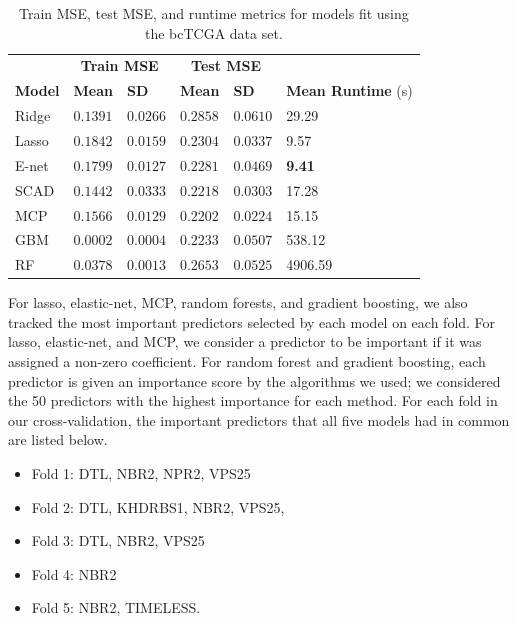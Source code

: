 \documentclass[final,onefignum,onetabnum]{siuro210301}
\begin{document}
	\begin{table}[h!]
		\centering
		\captionsetup{width = 5in}
		\caption{Train MSE, test MSE, and runtime metrics for models fit using the bcTCGA data set.}
		\label{tab:emp_results}
		\begin{tabular}{l|ll|ll|l}
			\hline
			& \multicolumn{2}{c|}{\textbf{Train MSE}} & \multicolumn{2}{c|}{\textbf{Test MSE}} &  \\ 
			\textbf{Model } & \textbf{Mean} & \textbf{SD} & \textbf{Mean} & \textbf{SD} & \textbf{Mean Runtime} (s) \\ 
			\hline
			Ridge  & $0.1391$ & $0.0266$ & $0.2858$ & $0.0610$ & 29.29\\
			Lasso  & $0.1842$ & $0.0159$ & $0.2304$ & $0.0337$ & 9.57\\
			E-net  & $0.1799$ & $0.0127$ & $0.2281$ & $0.0469$ & \textbf{9.41}\\
			SCAD  & $0.1442$ & $0.0333$ & $0.2218$ & $0.0303$ & 17.28\\
			MCP  & $0.1566$ & $0.0129$ & $\mathbf{0.2202}$ & $\mathbf{0.0224}$ & 15.15\\
			GBM  & $\mathbf{0.0002}$ & $\mathbf{0.0004}$ & $0.2233$ & $0.0507$ & 538.12\\
			RF  & $0.0378$ & $0.0013$ & $0.2653$ & $0.0525$ & 4906.59\\
			\hline 
		\end{tabular}
	\end{table}

	For lasso, elastic-net, MCP, random forests, and gradient boosting, we also tracked the most important predictors selected by each model on each fold. For lasso, elastic-net, and MCP, we consider a predictor to be important if it was assigned a non-zero coefficient. For random forest and gradient boosting, each predictor is given an importance score by the algorithms we used; we considered the 50 predictors with the highest importance for each method. For each fold in our cross-validation, the important predictors that all five models had in common are listed below.
	\begin{itemize}
		\item Fold 1: DTL, NBR2, NPR2, VPS25
		\item Fold 2: DTL, KHDRBS1, NBR2, VPS25,
		\item Fold 3: DTL, NBR2, VPS25
		\item Fold 4: NBR2
		\item Fold 5: NBR2, TIMELESS.
	\end{itemize}
	
\end{document}
